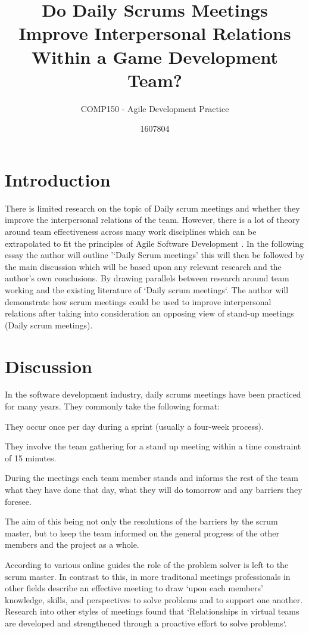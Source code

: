 \documentclass{scrartcl}
\title{Do Daily Scrums Meetings Improve Interpersonal Relations Within a Game Development Team?}
\subtitle{COMP150 - Agile Development Practice}
\author{1607804}
\begin{document}
\maketitle


\section{Introduction}
There is limited research on the topic of Daily scrum meetings and whether they improve the interpersonal relations of the team. However, there is a lot of theory around team effectiveness across many work disciplines which can be extrapolated to fit the principles of Agile Software Development \cite{Agile}. In the following essay the author will outline '‘Daily Scrum meetings' this will then be followed by the main discussion which will be based upon any relevant research and the author's own conclusions. By drawing parallels between research around team working and the existing literature of ‘Daily scrum meetings`. The author will demonstrate how scrum meetings could be used to improve interpersonal relations after taking into consideration an opposing view of stand-up meetings (Daily scrum meetings)\cite{badstand}. 


\section{Discussion}
In the software development industry, daily scrums meetings have been practiced for many years. They commonly take the following format:
\begin{description}
\item They occur once per day during a sprint (usually a four-week process). 
\item They involve the team gathering for a stand up meeting within a time constraint of 15 minutes. 
\item During the meetings each team member stands and informs the rest of the team what they have done that day, what they will do tomorrow and any barriers they foresee.
\item The aim of this being not only the resolutions of the barriers by the scrum master, but to keep the team informed on the general progress of the other members and the project as a whole. 
\end{description}


According to various online guides\cite{DailyScrum, EffectiveScrum} the role of the problem solver is left to the scrum master. In contrast to this, in more traditonal meetings professionals in other fields describe an effective meeting to draw `upon each members' knowledge, skills, and perspectives to solve problems and to support one another\cite{LeadershipLesson}. Research into other styles of meetings found that `Relationships in virtual teams are developed and strengthened through a proactive effort to solve problems`\cite[p. 559]{tavvcar2005skills}. 
\end{document}
